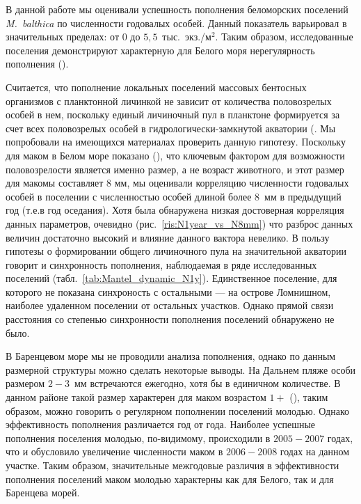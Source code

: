 \par\bigskip
В данной работе мы оценивали успешность пополнения беломорских поселений \textit{M.~balthica} по численности годовалых особей.
Данный показатель варьировал в значительных пределах: от $0$ до $5,5$~тыс.~экз./м$^2$.
Таким образом, исследованные поселения демонстрируют характерную для Белого моря нерегулярность пополнения (\cite{Maximovich_et_al_1991, Maximovich_Gerasimova_2004, Gerasimova_Maximovich_2009}).

Считается, что пополнение локальных поселений массовых бентосных организмов с планктонной личинкой не зависит от количества половозрелых особей в нем, поскольку единый личиночный пул в планктоне формируется за счет всех половозрелых особей в гидрологически-замкнутой акватории (\cite{Maximovich_Shilin_2012}.
Мы попробовали на имеющихся материалах проверить данную гипотезу.
Поскольку для маком в Белом море показано (\cite{Semenova_1980, Maximovich_1985}), что ключевым фактором для возможности половозрелости является именно размер, а не возраст животного, и этот размер для макомы составляет 8 мм, мы оценивали корреляцию численности годовалых особей в поселении с численностью особей длиной более $8$~мм в предыдущий год (т.е.в год оседания).
Хотя была обнаружена низкая достоверная корреляция данных параметров, очевидно (рис.~\ref{ris:N1year_vs_N8mm}) что разброс данных величин достаточно высокий и влияние данного вактора невелико.
В пользу гипотезы о формировании общего личиночного пула на значительной акватории говорит и синхронность пополнения, наблюдаемая в ряде исследованных поселений (табл.~\ref{tab:Mantel_dynamic_N1y}).
Единственное поселение, для которого не показана синхроность с остальными --- на острове Ломнишном, наиболее удаленном поселении от остальных участков.
Однако прямой связи расстояния со степенью синхронности пополнения поселений обнаружено не было.

В Баренцевом море мы не проводили анализа пополнения, однако по данным размерной структуры можно сделать некоторые выводы.
На Дальнем пляже особи размером $2-3$~мм встречаются ежегодно, хотя бы в единичном количестве.
В данном районе такой размер характерен для маком возрастом $1+$ (\cite{Nazarova_et_al_2010}), таким образом, можно говорить о регулярном пополнении поселений молодью. 
Однако эффективность пополнения различается год от года. 
Наиболее успешные пополнения поселения молодью, по-видимому, происходили в $2005-2007$ годах, что и обусловило увеличение численности маком в $2006-2008$ годах на данном участке.
Таким образом, значительные межгодовые различия в эффективности пополнения поселений маком молодью характерны как для Белого, так и для Баренцева морей.

